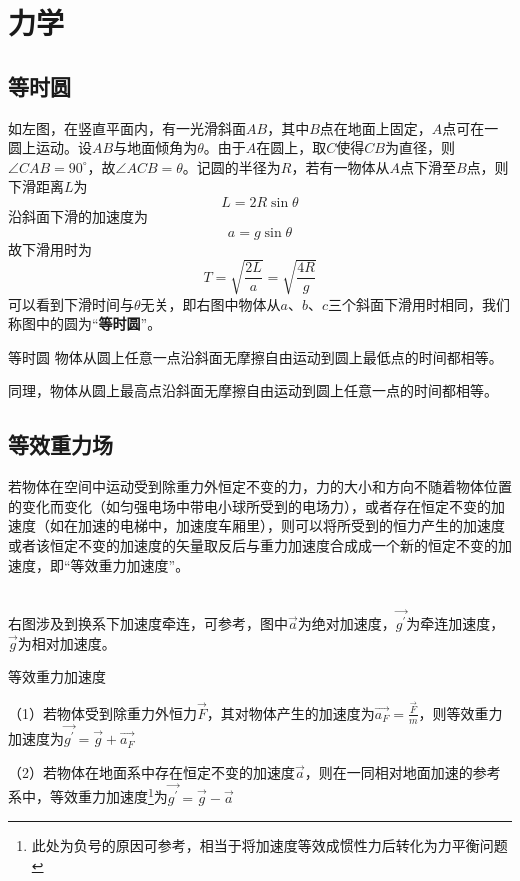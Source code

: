 
\chapter{力学}

\section{等时圆}


如左图，在竖直平面内，有一光滑斜面$AB$，其中$B$点在地面上固定，$A$点可在一圆上运动。设$AB$与地面倾角为$\theta$。由于$A$在圆上，取$C$使得$CB$为直径，则$\angle CAB = 90^{\circ}$，故$\angle ACB = \theta$。记圆的半径为$R$，若有一物体从$A$点下滑至$B$点，则下滑距离$L$为
$$L=2R \sin \theta$$
沿斜面下滑的加速度为
$$a=g \sin \theta$$
故下滑用时为
$$T = \sqrt{\frac{2L}{a}} = \sqrt{\frac{4R}{g}}$$
可以看到下滑时间与$\theta$无关，即右图中物体从$a$、$b$、$c$三个斜面下滑用时相同，我们称图中的圆为“\textbf{等时圆}”。

\begin{theo}{等时圆}{}
物体从圆上任意一点沿斜面无摩擦自由运动到圆上最低点的时间都相等。

同理，物体从圆上最高点沿斜面无摩擦自由运动到圆上任意一点的时间都相等。
\end{theo}

\section{等效重力场}
若物体在空间中运动受到除重力外恒定不变的力，力的大小和方向不随着物体位置的变化而变化（如匀强电场中带电小球所受到的电场力），或者存在恒定不变的加速度（如在加速的电梯中，加速度车厢里），则可以将所受到的恒力产生的加速度或者该恒定不变的加速度的矢量取反后与重力加速度合成成一个新的恒定不变的加速度，即“等效重力加速度”。

\begin{minipage}[b]{0.4\linewidth}

\end{minipage}
\hfill
\begin{minipage}[b]{0.4\linewidth}

\end{minipage}
~\\
右图涉及到换系下加速度牵连，可参考，图中$\vec{a}$为绝对加速度，$\vec{g^{\prime}}$为牵连加速度，$\vec{g}$为相对加速度。
\begin{defi}{等效重力加速度}{}

（1）若物体受到除重力外恒力$\vec{F}$，其对物体产生的加速度为$\vec{a_F} = \frac{\vec{F}}{m}$，则等效重力加速度为$\vec{g^{\prime}} = \vec{g} + \vec{a_F}$

（2）若物体在地面系中存在恒定不变的加速度$\vec{a}$，则在一同相对地面加速的参考系中，等效重力加速度\footnote{此处为负号的原因可参考，相当于将加速度等效成惯性力后转化为力平衡问题}为$\vec{g^{\prime}} = \vec{g} - \vec{a}$
\end{defi}

